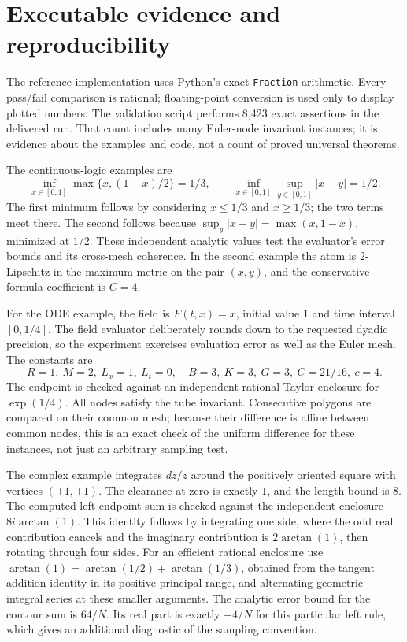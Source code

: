 \section{Executable evidence and reproducibility}\label{sec:validation}

The reference implementation uses Python's exact \texttt{Fraction} arithmetic.
Every pass/fail comparison is rational; floating-point conversion is used only
to display plotted numbers. The validation script performs 8,423 exact
assertions in the delivered run. That count includes many Euler-node invariant
instances; it is evidence about the examples and code, not a count of proved
universal theorems.

The continuous-logic examples are
\[
 \inf_{x\in[0,1]}\max\{x,(1-x)/2\}=1/3,
 \qquad
 \inf_{x\in[0,1]}\sup_{y\in[0,1]}|x-y|=1/2.
\]
The first minimum follows by considering $x\le1/3$ and $x\ge1/3$; the
two terms meet there. The second follows because
$\sup_y|x-y|=\max(x,1-x)$, minimized at $1/2$. These independent analytic
values test the evaluator's error bounds and its cross-mesh coherence.
In the second example the atom is 2-Lipschitz in the maximum metric on
the pair $(x,y)$, and the conservative formula coefficient is $C=4$.

For the ODE example, the field is $F(t,x)=x$, initial value $1$ and time
interval $[0,1/4]$. The field evaluator deliberately rounds down to the
requested dyadic precision, so the experiment exercises evaluation error
as well as the Euler mesh. The constants are
\[
 R=1,\ M=2,\ L_x=1,\ L_t=0,\quad
 B=3,\ K=3,\ G=3,\ C=21/16,\ c=4.
\]
The endpoint is checked against an independent rational Taylor enclosure
for $\exp(1/4)$. All nodes satisfy the tube invariant. Consecutive polygons
are compared on their common mesh; because their difference is affine
between common nodes, this is an exact check of the uniform difference
for these instances, not just an arbitrary sampling test.

The complex example integrates $dz/z$ around the positively oriented square
with vertices $(\pm1,\pm1)$. The clearance at zero is exactly $1$, and the
length bound is $8$. The computed left-endpoint sum is checked against the
independent enclosure $8i\arctan(1)$. This identity follows by integrating
one side, where the odd real contribution cancels and the imaginary
contribution is $2\arctan(1)$, then rotating through four sides.
For an efficient rational enclosure use
$\arctan(1)=\arctan(1/2)+\arctan(1/3)$, obtained from the tangent addition
identity in its positive principal range, and alternating geometric-integral
series at these smaller arguments. The analytic error bound for the contour
sum is $64/N$. Its real part is exactly $-4/N$ for this particular left rule,
which gives an additional diagnostic of the sampling convention.

